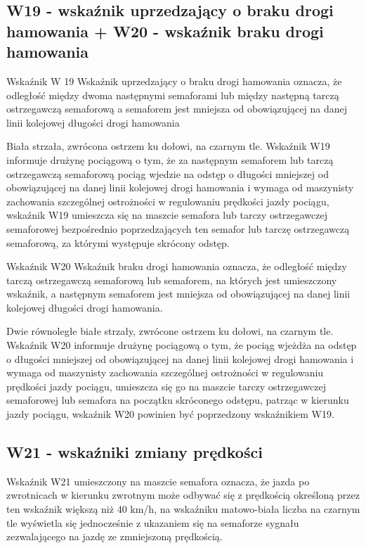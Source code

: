 \subsection{W19 - wskaźnik uprzedzający o braku drogi hamowania + W20 - wskaźnik braku drogi hamowania}

Wskaźnik W 19 {\textquotedbl}Wskaźnik uprzedzający o braku drogi hamowania{\textquotedbl} oznacza, że odległość między dwoma następnymi semaforami lub między następną tarczą ostrzegawczą semaforową a semaforem jest mniejsza od obowiązującej na danej linii kolejowej długości drogi hamowania 

Biała strzała, zwrócona ostrzem ku dołowi, na czarnym tle. Wskaźnik W19 informuje drużynę pociągową o tym, że za następnym semaforem lub tarczą ostrzegawczą semaforową pociąg wjedzie na odstęp o długości mniejszej od obowiązującej na danej linii kolejowej drogi hamowania i wymaga od maszynisty zachowania szczególnej ostrożności w regulowaniu
prędkości jazdy pociągu, wskaźnik W19 umieszcza się na maszcie semafora lub tarczy ostrzegawczej semaforowej bezpośrednio poprzedzających ten semafor lub tarczę ostrzegawczą semaforową, za którymi występuje skrócony odstęp. 

Wskaźnik W20 {\textquotedbl}Wskaźnik braku drogi hamowania{\textquotedbl} oznacza, że odległość między tarczą ostrzegawczą semaforową lub semaforem, na których jest umieszczony wskaźnik, a następnym semaforem jest mniejsza od obowiązującej na danej linii kolejowej długości drogi hamowania. 

Dwie równoległe białe strzały, zwrócone ostrzem ku dołowi, na czarnym tle. Wskaźnik W20 informuje drużynę pociągową o
tym, że pociąg wjeżdża na odstęp o długości mniejszej od obowiązującej na danej linii kolejowej drogi hamowania i
wymaga od maszynisty zachowania szczególnej ostrożności w regulowaniu prędkości jazdy pociągu, umieszcza się go na
maszcie tarczy ostrzegawczej semaforowej lub semafora na początku skróconego odstępu, patrząc w kierunku jazdy pociągu,
wskaźnik W20 powinien być poprzedzony wskaźnikiem W19.

\subsection{W21 - wskaźniki zmiany prędkości}

Wskaźnik W21 umieszczony na maszcie semafora oznacza, że jazda po zwrotnicach w kierunku zwrotnym może odbywać się z prędkością określoną przez ten  wskaźnik większą niż 40 km/h, na wskaźniku matowo-biała liczba na czarnym tle wyświetla się jednocześnie z ukazaniem się na semaforze sygnału zezwalającego na jazdę ze zmniejszoną prędkością.

